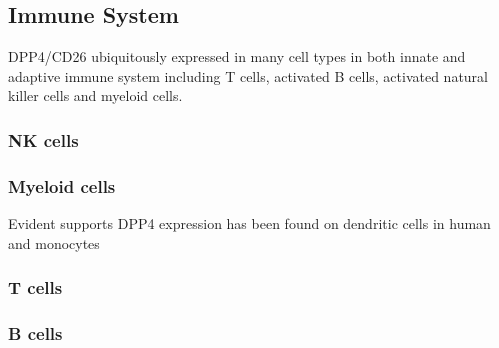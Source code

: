\subsection{Immune System}
DPP4/CD26 ubiquitously expressed in many cell types in both innate and adaptive immune system including T cells, activated B cells, activated natural killer cells and myeloid cells.~\cite{Abbott1994,Shingu2003,Hong1989,Gutschmidt1981,Dikov2004,Bühling1995,Tanaka1992,Gorrell1991}  

\subsubsection{NK cells}

\subsubsection{Myeloid cells}
Evident supports DPP4 expression has been found on dendritic cells in human~\cite{Zhong2013,Gliddon2002,Epardaud2004} and monocytes

\subsubsection{T cells}
\subsubsection{B cells}
